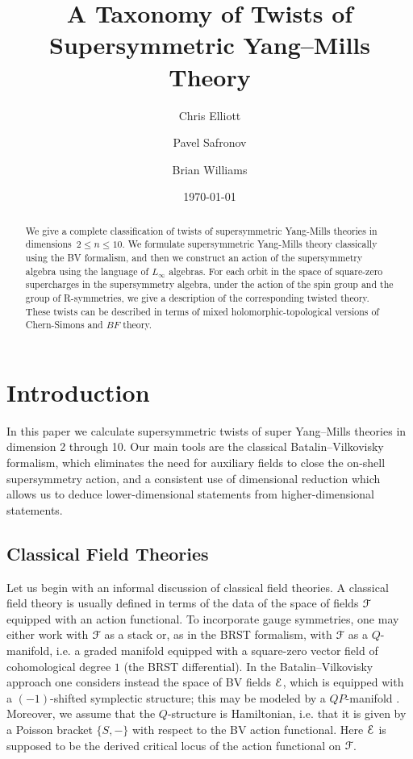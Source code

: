 \documentclass[10pt, oneside]{article}
\title{A Taxonomy of Twists of Supersymmetric Yang--Mills Theory}
\author{Chris Elliott\and Pavel Safronov \and Brian Williams}
\date{\today}
\begin{document}
\maketitle

\begin{abstract}
We give a complete classification of twists of supersymmetric Yang-Mills theories in dimensions~$2\leq n \leq 10$.
We formulate supersymmetric Yang-Mills theory classically using the BV formalism, and then we construct an action of the supersymmetry algebra using the language of $L_\infty$ algebras.  For each orbit in the space of square-zero supercharges in the supersymmetry algebra, under the action of the spin group and the group of R-symmetries, we give a description of the corresponding twisted theory.  These twists can be described in terms of mixed holomorphic-topological versions of Chern-Simons and $BF$ theory. 
\end{abstract}

\setcounter{tocdepth}{2}
\tableofcontents

\pagestyle{intro}
\section*{Introduction} 
\label{sect:intro}

In this paper we calculate supersymmetric twists of super Yang--Mills theories in dimension 2 through 10. Our main tools are the classical Batalin--Vilkovisky formalism, which eliminates the need for auxiliary fields to close the on-shell supersymmetry action, and a consistent use of dimensional reduction which allows us to deduce lower-dimensional statements from higher-dimensional statements.

\subsection*{Classical Field Theories}

Let us begin with an informal discussion of classical field theories. A classical field theory is usually defined in terms of the data of the space of fields $\mathcal F$ equipped with an action functional. To incorporate gauge symmetries, one may either work with $\mathcal F$ as a stack or, as in the BRST formalism, with $\mathcal F$ as a $Q$-manifold, i.e. a graded manifold equipped with a square-zero vector field of cohomological degree $1$ (the BRST differential). In the Batalin--Vilkovisky approach one considers instead the space of BV fields $\mathcal E$, which is equipped with a $(-1)$-shifted symplectic structure; this may be modeled by a $QP$-manifold \cite{Schwarz}. Moreover, we assume that the $Q$-structure is Hamiltonian, i.e. that it is given by a Poisson bracket $\{S, -\}$ with respect to the BV action functional. Here $\mathcal E$ is supposed to be the derived critical locus of the action functional on $\mathcal F$.
\end{document}
